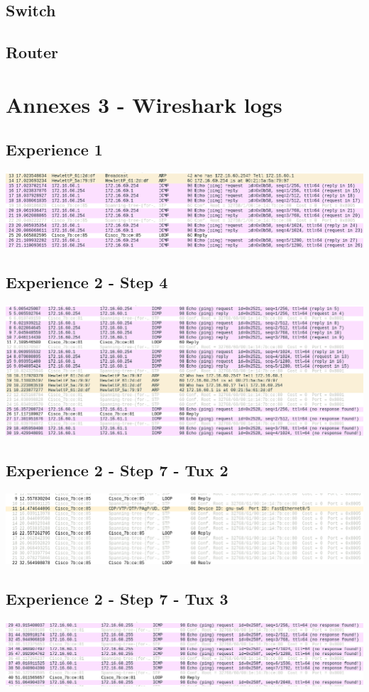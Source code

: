 \documentclass[11pt]{report}
\begin{document}
\subsection{Switch}


\subsection{Router}


\section{Annexes 3 - Wireshark logs}
\subsection{Experience 1}
  \includegraphics[width=1\textwidth]{images/exp1.png}
\subsection{Experience 2 - Step 4}
  \includegraphics[width=1\textwidth]{images/exp2_step4.png}
\subsection{Experience 2 - Step 7 - Tux 2}
  \includegraphics[width=1\textwidth]{images/exp2_step7_tux2.png}
\subsection{Experience 2 - Step 7 - Tux 3}
  \includegraphics[width=1\textwidth]{images/exp2_step7_tux3.png}
\end{document}
